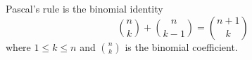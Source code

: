 \documentclass[12pt]{article}
\begin{document}
Pascal's rule is the binomial identity
\[ \binom{n}{k} + \binom{n}{k-1} = \binom{n+1}{k} \]
where $1 \leq k \leq n$ and $\binom{n}{k}$ is the binomial coefficient.
\end{document}
